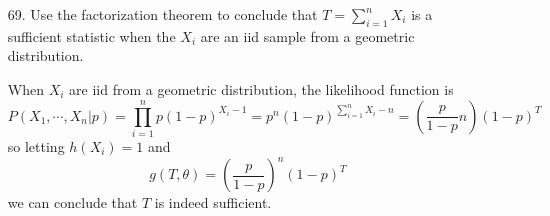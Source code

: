 \documentclass{article}
\begin{document}
\begin{itemize}
\begin{enumerate}[a.]
			\item Show that $X_1$ is not sufficient.
				\begin{soln}
					We have 
					\begin{align*}
						P(X_1=x_1|T=t) = \frac{P(X_1=x_1, T=t)}{P(T=t)}=\frac{P\left( X_1=t-\sum_{i=2}^{n} x_i \right)}{P(T=t)} 
					\end{align*}
					where the numerator is given by
					\begin{align*}
						\frac{\lambda^{t-\sum_{i=2}^{n}x_i}e^{-\lambda}}{\left( t-\sum_{i=2}^{n}x_i \right)!}
					\end{align*} and the denominator is given by $\displaystyle \frac{(n\lambda)^t e^{-n\lambda}}{t!}$ so the conditional probability is something ugly, but definitely depends on $\lambda,$ so $X_1$ is not sufficient, as desired.

				\end{soln}

			\item Use Theorem A of section 8.8.1 to show that $T$ is sufficient. Identify the functions $g$ and $h$ of that theorem.
				\begin{proof}
					The likelihood function is given by \[\prod_{i=1}^{n} P(X_i=x_i)=\prod_{i=1}^{n}\frac{\lambda^{x_i}e^{-\lambda}}{x_i!} = e^{-n\lambda} \lambda^{\sum_{i=1}^{n} x_i}\prod_{i=1}^{n} \frac{1}{x_i!}=e^{-n\lambda} \lambda^T \prod_{i=1}^{n}\frac{1}{x_i!}\] so by the factorization theorem, $T$ is sufficient, as desired. The functions $g$ and $h$ are given by
					\begin{align*}
						h(x_1, \cdots, x_n) &= \prod_{i=1}^{n}\frac{1}{x_i!} \\
						g(T, \lambda) &= e^{-n\lambda} \lambda^T
					\end{align*}
					
				\end{proof}
				
		\end{enumerate}

	\item[69.] Use the factorization theorem to conclude that $\displaystyle T=\sum_{i=1}^{n} X_i$ is a sufficient statistic when the $X_i$ are an iid sample from a geometric distribution.
		\begin{soln}
			When $X_i$ are iid from a geometric distribution, the likelihood function is \[P(X_1, \cdots, X_n|p) = \prod_{i=1}^n p(1-p)^{X_i-1} = p^n (1-p)^{\sum_{i=1}^{n} X_i - n} = \left( \frac{p}{1-p}n \right)(1-p)^T\] so letting $h(X_i) = 1$ and \[g(T, \theta) = \left( \frac{p}{1-p} \right)^n (1-p)^T\] we can conclude that $T$ is indeed sufficient.
			

\end{soln}
\end{itemize}
\end{document}
